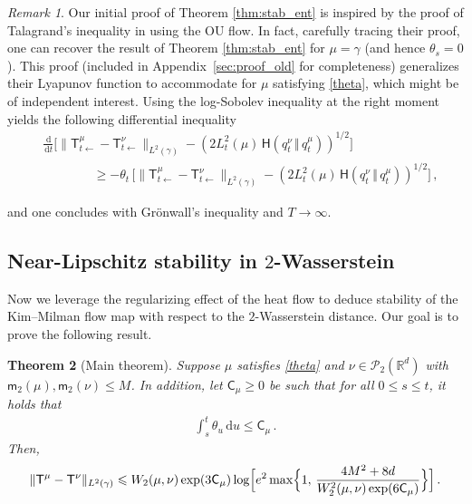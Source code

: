 \documentclass[12pt]{article}
\newcommand{\cP}{\mathcal{P}}
\newcommand{\RR}{\mathbb{R}}
\newcommand{\R}{\RR}
\newcommand{\1}{\mathds{1}}
\newcommand*{\rd}{\mathrm{d}}
\newcommand*{\dd}{\, \rd}
\newcommand{\mmid}{\,\Vert\,}
\renewcommand{\geq}{\geqslant}
\renewcommand{\leq}{\leqslant}
\newcommand{\KM}{\mathsf T}
\theoremstyle{plain}
\newtheorem{theorem}{Theorem}[section]
\theoremstyle{definition}
\theoremstyle{remark}
\newtheorem{remark}[theorem]{Remark}
\begin{document}
\begin{remark}
Our initial proof of Theorem \ref{thm:stab_ent} is inspired by the proof of Talagrand's inequality in \cite{otto2000generalization} using the OU flow. In fact, carefully tracing their proof, one can recover the result of Theorem \ref{thm:stab_ent} for $\mu = \gamma$ (and hence $\theta_s =0$). This proof (included in Appendix~\ref{sec:proof_old} for completeness) generalizes their Lyapunov function to accommodate for $\mu$ satisfying \eqref{theta}, which might be of independent interest. Using the log-Sobolev inequality at the right moment yields the following differential inequality
\begin{align*}
&\frac{\dd}{\dd t} \bigl[ \|\KM^\mu_{t\gets} - \KM^\nu_{t\gets}\|_{L^2(\gamma)} - (2L^2_{t}(\mu)\,{\mathsf H}(q^\nu_{t}\mmid q^\mu_{t}))^{1/2} \bigr] \\
&\qquad \qquad \geq -\theta_{t}\,\bigl[\|\KM^\mu_{t\gets} - \KM^\nu_{t\gets}\|_{L^2(\gamma)} - (2L^2_{t}(\mu)\,{\mathsf H}(q^\nu_{t}\mmid q^\mu_{t}))^{1/2}\bigr]\,,
\end{align*}

and one concludes with Grönwall's inequality and $T \rightarrow \infty$.
\end{remark}


\subsection{Near-Lipschitz stability in \texorpdfstring{$2$}{2}-Wasserstein}


Now we leverage the regularizing effect of the heat flow to deduce stability of the Kim--Milman flow map with respect to the $2$-Wasserstein distance. Our goal is to prove the following result.

\begin{theorem}[Main theorem]\label{thm:wass_stab}
    Suppose $\mu$ satisfies \eqref{theta} and $\nu \in \cP_2(\R^d)$ with $\mathsf m_2(\mu),\mathsf m_2(\nu) \leq M$. In addition, let $\mathsf C_\mu \geq 0$ be such that for all $0\leq s\leq t$, it holds that
    \begin{align}\label{eq:int_cond}
        \int_s^t \theta_u \dd u \leq \mathsf C_\mu\,.
    \end{align}
    Then,
    \begin{align*}
        \|\mathsf T^{\mu} - \mathsf T^{\nu}\|_{L^2(\gamma)} \leq
        W_2(\mu,\nu)\exp(3\mathsf C_\mu) \log\Bigl[e^2\max\Bigl\{1,\, \frac{4M^2 + 8d}{W_2^2(\mu,\nu)\exp(6\mathsf C_\mu)}\Bigr\}\Bigr]\,.
    \end{align*}
\end{theorem} 
\end{document}
